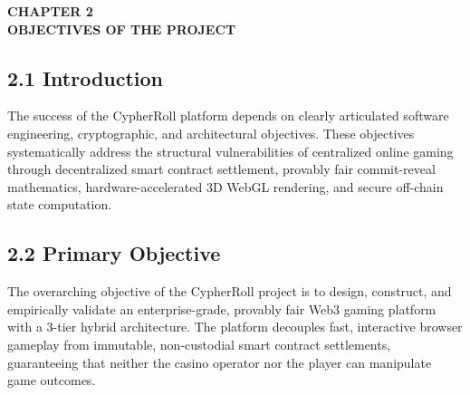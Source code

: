\vspace*{0.5cm}
\begin{center}
\textbf{CHAPTER 2}\\[0.15cm]
\textbf{OBJECTIVES OF THE PROJECT}
\end{center}
\label{chap:objectives}
\vspace{0.4cm}

\subsection*{2.1 Introduction}
The success of the CypherRoll platform depends on clearly articulated software engineering, cryptographic, and architectural objectives. These objectives systematically address the structural vulnerabilities of centralized online gaming through decentralized smart contract settlement, provably fair commit-reveal mathematics, hardware-accelerated 3D WebGL rendering, and secure off-chain state computation.

\subsection*{2.2 Primary Objective}
The overarching objective of the CypherRoll project is to design, construct, and empirically validate an enterprise-grade, provably fair Web3 gaming platform with a 3-tier hybrid architecture. The platform decouples fast, interactive browser gameplay from immutable, non-custodial smart contract settlements, guaranteeing that neither the casino operator nor the player can manipulate game outcomes.

